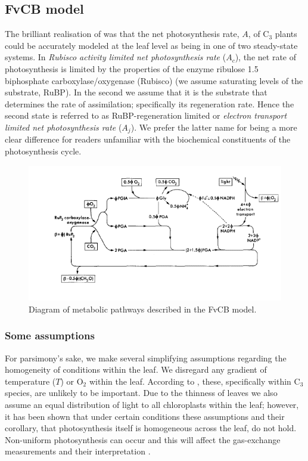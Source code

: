 \documentclass[11pt]{article} %
\begin{document}
\subsection{FvCB model}
The brilliant realisation of \citet{Farquharbiochemicalmodelphotosynthetic1980} was that the net photosynthesis rate, $A$, of C$_3$ plants could be accurately modeled at the leaf level as being in one of two steady-state systems. In \emph{Rubisco activity limited net photosynthesis rate} ($A_c$), the net rate of photosynthesis is limited by the properties of the enzyme ribulose 1.5 biphosphate carboxylase/oxygenase (Rubisco) (we assume saturating levels of the substrate, RuBP). In the second we assume that it is the substrate that determines the rate of assimilation; specifically its regeneration rate. Hence the second state is referred to as RuBP-regeneration limited or \emph{electron transport limited net photosynthesis rate} ($A_j$)\cite{YinUsingcombinedmeasurements2009}. We prefer the latter name for being a more clear difference for readers unfamiliar with the biochemical constituents of the photosynthesis cycle.

\begin{figure}[h]
\centering
\includegraphics[scale=0.75]{Images/fvcb_model}
\caption{Diagram of metabolic pathways described in the FvCB model.}
\label{fig:fvcb}
\end{figure}

\subsubsection{Some assumptions} \label{Assumptions}
For parsimony's sake, we make several simplifying assumptions regarding the homogeneity of conditions within the leaf. We disregard any gradient of temperature ($T$) or O$_2$ within the leaf. According to \citet{CaemmererBiochemicalmodelsleaf2000}, these, specifically within C$_3$ species, are unlikely to be important. Due to the thinness of leaves we also assume an equal distribution of light to all chloroplasts within the leaf; however, it has been shown that under certain conditions these assumptions and their corollary, that photosynthesis itself is homogeneous across the leaf, do not hold. Non-uniform photosynthesis can occur and this will affect the gas-exchange measurements and their interpretation \cite{TerashimaAnatomynonuniformleaf1992}.
\end{document}
